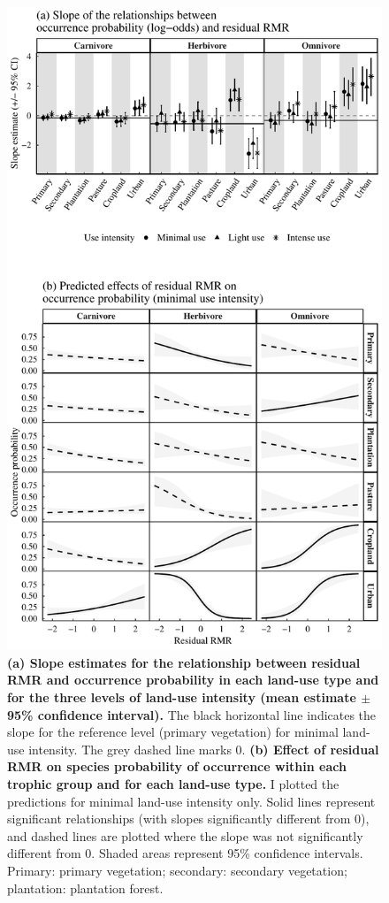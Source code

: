 \clearpage
\begin{figure}[h!]
\centering
\includegraphics[scale=0.65]{figures/Chapter5/Figure4}
\caption[Slope estimates and predictions for the relationship between occurrence probability and residual RMR]{\textbf{(a) Slope estimates for the relationship between residual RMR and occurrence probability in each land-use type and for the three levels of land-use intensity (mean estimate $\pm$95\% confidence interval).} The black horizontal line indicates the slope for the reference level (primary vegetation) for minimal land-use intensity. The grey dashed line marks 0. \textbf{(b) Effect of residual RMR on species probability of occurrence within each trophic group and for each land-use type.} I plotted the predictions for minimal land-use intensity only. Solid lines represent significant relationships (with slopes significantly different from 0), and dashed lines are plotted where the slope was not significantly different from 0. Shaded areas represent 95\% confidence intervals. Primary: primary vegetation; secondary: secondary vegetation; plantation: plantation forest.}
\label{chap5_fig4}
\end{figure}

